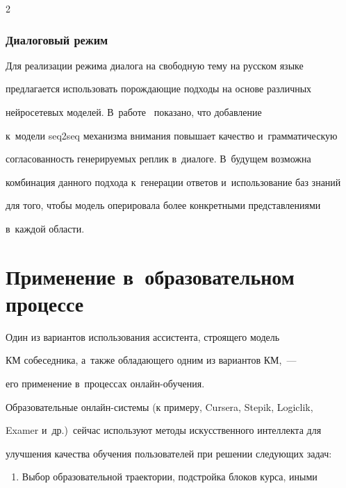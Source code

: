 \begin{multicols}{2}
  


  \subsubsection{Диалоговый режим}%


  


  Для реализации режима диалога на свободную тему на русском языке 


предлагается использовать порождающие подходы на основе различных 


нейросетевых моделей. В~работе~\cite{13-sm} показано, что добавление 


к~модели seq2seq механизма внимания повышает качество и~грамматическую 


согласованность генерируемых реплик в~диалоге. В~будущем возможна 


комбинация данного подхода к~генерации ответов и~использование баз знаний 


для того, чтобы модель оперировала более конкретными представлениями 


в~каждой области.





\section{Применение в~образовательном процессе}





  Один из вариантов использования ассистента, строящего модель 


КМ собеседника, а~также обладающего одним из вариантов КМ,~--- 


  его применение в~процессах он\-лайн-обуче\-ния. 


  


  Образовательные он\-лайн-сис\-те\-мы (к примеру, Cursera, Stepik, Logiclik, 


Examer и~др.)\ сейчас используют методы искусственного интеллекта для 


улучшения качества обучения пользователей при решении следующих задач:


\begin{enumerate}[1.]


\item Выбор образовательной траектории, подстройка блоков курса, иными 



\end{enumerate}
\end{multicols}
